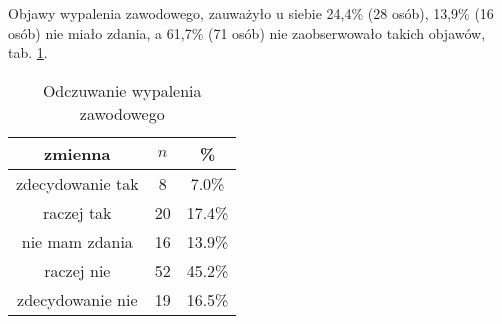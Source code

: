 Objawy wypalenia zawodowego, zauważyło u siebie 24,4\% (28 osób), 13,9\% (16 osób) nie miało zdania, a 61,7\% (71 osób) nie zaobserwowało takich objawów, tab. \ref{tab:Q35}.


\begin{table}[H]
\caption{Odczuwanie wypalenia zawodowego}
\centering
\begin{tabular}{ | c | c | c |}
\hline
zmienna & $n$ & \% \\
\hline
zdecydowanie tak  &  8  & 7.0\% \\
\hline
raczej tak  &  20  & 17.4\% \\
\hline
nie mam zdania  &  16  & 13.9\% \\
\hline
raczej nie  &  52  & 45.2\% \\
\hline
zdecydowanie nie  &  19  & 16.5\% \\
\hline
\end{tabular}
\label{tab:Q35}
\end{table}
